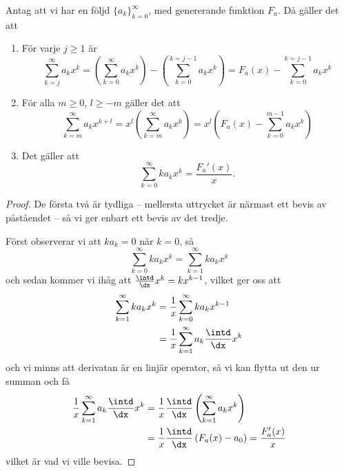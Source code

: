 \documentclass[nobib]{tufte-handout}
\begin{document}
\begin{lemma}\label{lemma_generating_function_calc_rules}
    Antag att vi har en följd $\{a_k\}_{k=0}^\infty$, med genererande funktion $F_a$. Då gäller det att
    \begin{enumerate}
        \item För varje $j \geq 1$ är
        $$\sum_{k = j}^{\infty} a_k x^k = \left(\sum_{k=0}^{\infty}a_k x^k\right) - \left(\sum_{k=0}^{k=j-1} a_kx^k\right) = F_a(x) - \sum_{k=0}^{k=j-1} a_kx^k$$
        \item För alla $m \geq 0$, $l \geq -m$ gäller det att
        $$\sum_{k=m}^{\infty} a_k x^{k + l} = x^l\left(\sum_{k=m}^{\infty} a_k x^{k}\right) = x^l\left(F_a(x) - \sum_{k=0}^{m-1} a_k x^k\right)$$
        \item Det gäller att
        $$\sum_{k=0}^{\infty} k a_k x^k = \frac{F_a'(x)}{x}.$$
        
    \end{enumerate}
    \begin{proof}
        De första två är tydliga -- mellersta uttrycket är närmast ett bevis av påståendet -- så vi ger enbart ett bevis av det tredje.

        Först observerar vi att $ka_k=0$ när $k=0$, så
        $$\sum_{k=0}^{\infty} k a_k x^k = \sum_{k=1}^{\infty} k a_k x^k$$
        och sedan kommer vi ihåg att $\frac{\intd}{\dx} x^{k} = k x^{k-1}$, vilket ger oss att
        \begin{align*}
            \sum_{k=1}^{\infty} k a_k x^k &= \frac{1}{x}\sum_{k=0}^{\infty} k a_k x^{k-1}\\
            &= \frac{1}{x}\sum_{k=1}^{\infty} a_k \frac{\intd}{\dx} x^k
        \end{align*}
        och vi minns att derivatan är en linjär operator, så vi kan flytta ut den ur summan och få
        \begin{align*}
            \frac{1}{x}\sum_{k=1}^{\infty} a_k \frac{\intd}{\dx} x^k &= \frac{1}{x} \frac{\intd}{\dx} \left(\sum_{k=1}^{\infty} a_k x^k\right)\\
            &= \frac{1}{x}\frac{\intd}{\dx}\left(F_a(x) - a_0\right) = \frac{F_a'(x)}{x}
        \end{align*}
        vilket är vad vi ville bevisa.
    \end{proof}
\end{lemma}
\end{document}
